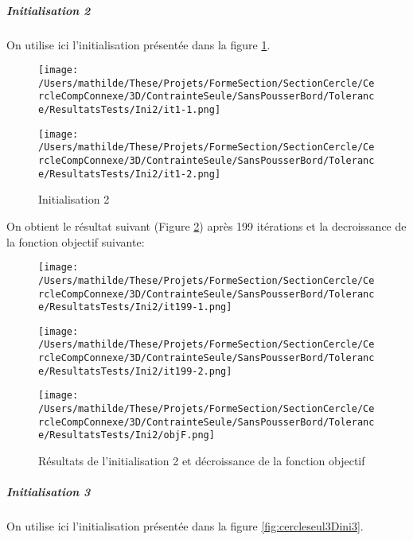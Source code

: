 \documentclass[11pt,a4paper]{article}
\begin{document}
\subparagraph{Initialisation 2} On utilise ici l'initialisation présentée dans la figure \ref{fig:cercleseul3Dini2}.

\begin{figure}[H]
	\label{fig:cercleseul3Dini2}
	\begin{minipage}{0.45\textwidth}
		\centering
		\texttt{[image: /Users/mathilde/These/Projets/FormeSection/SectionCercle/CercleCompConnexe/3D/ContrainteSeule/SansPousserBord/Tolerance/ResultatsTests/Ini2/it1-1.png]}
	\end{minipage}
	\begin{minipage}{0.45\textwidth}
		\centering
		\texttt{[image: /Users/mathilde/These/Projets/FormeSection/SectionCercle/CercleCompConnexe/3D/ContrainteSeule/SansPousserBord/Tolerance/ResultatsTests/Ini2/it1-2.png]}
	\end{minipage}
	\caption{Initialisation 2}	
\end{figure}

On obtient le résultat suivant (Figure \ref{fig:cercleseul3Dini2Fin}) après 199 itérations et la decroissance de la fonction objectif suivante:

\begin{figure}[H]
	\label{fig:cercleseul3Dini2Fin}
	\begin{minipage}{0.33\textwidth}
		\centering
		\texttt{[image: /Users/mathilde/These/Projets/FormeSection/SectionCercle/CercleCompConnexe/3D/ContrainteSeule/SansPousserBord/Tolerance/ResultatsTests/Ini2/it199-1.png]}
	\end{minipage}
	\begin{minipage}{0.33\textwidth}
		\centering
		\texttt{[image: /Users/mathilde/These/Projets/FormeSection/SectionCercle/CercleCompConnexe/3D/ContrainteSeule/SansPousserBord/Tolerance/ResultatsTests/Ini2/it199-2.png]}
	\end{minipage}	
	\begin{minipage}{0.33\textwidth}
		\centering
		\texttt{[image: /Users/mathilde/These/Projets/FormeSection/SectionCercle/CercleCompConnexe/3D/ContrainteSeule/SansPousserBord/Tolerance/ResultatsTests/Ini2/objF.png]}
	\end{minipage}	
	\caption{Résultats de l'initialisation 2 et décroissance de la fonction objectif}	
\end{figure}


\subparagraph{Initialisation 3} On utilise ici l'initialisation présentée dans la figure \ref{fig:cercleseul3Dini3}.
\end{document}
